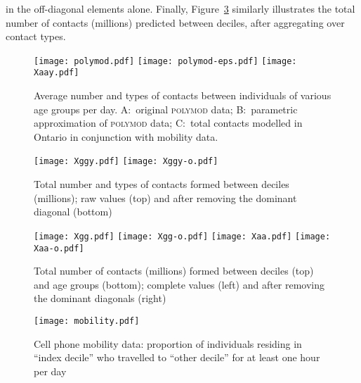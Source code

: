 \documentclass{article}
\begin{document}
  in the off-diagonal elements alone.
  Finally, Figure~\ref{fig:Xgg} similarly illustrates the total number of contacts (millions)
  predicted between deciles, after aggregating over contact types.
  \clearpage{}
  \begin{lswide}
    \begin{figure}[H]
      \centering
      \texttt{[image: polymod.pdf]}
      \texttt{[image: polymod-eps.pdf]}
      \texttt{[image: Xaay.pdf]}
      \caption{Average number and types of contacts between individuals of various age groups per day.
        A:~original \textsc{polymod} data;
        B:~parametric approximation of \textsc{polymod} data;
        C:~total contacts modelled in Ontario in conjunction with mobility data.}
      \label{fig:polymod}
    \end{figure}
  \end{lswide}
  \begin{lswide}
    \begin{figure}[H]
      \centering
      \texttt{[image: Xggy.pdf]}
      \texttt{[image: Xggy-o.pdf]}
      \caption{Total number and types of contacts formed between deciles (millions);
        raw values (top) and after removing the dominant diagonal (bottom)}
      \label{fig:Xggy}
    \end{figure}
  \end{lswide}
  \begin{figure}[H]
    \centering
    \texttt{[image: Xgg.pdf]}
    \texttt{[image: Xgg-o.pdf]}
    \texttt{[image: Xaa.pdf]}
    \texttt{[image: Xaa-o.pdf]}
    \caption{Total number of contacts (millions) formed between deciles (top) and age groups (bottom);
      complete values (left) and after removing the dominant diagonals (right)}
    \label{fig:Xgg}
  \end{figure}
  \begin{figure}[H]
    \centering
    \texttt{[image: mobility.pdf]}
    \caption{Cell phone mobility data:
      proportion of individuals residing in ``index decile'' who travelled to ``other decile''
      for at least one hour per day}
    \label{fig:mobility}
  \end{figure}
\end{document}
